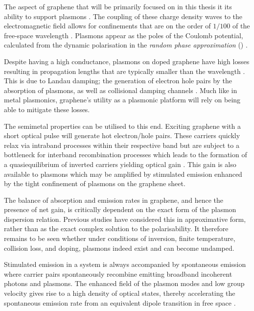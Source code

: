 The aspect of graphene that will be primarily focused on in this thesis it its
ability to support plasmons
\cite{Shin2011,Chen2012,Fei2012,Grigorenko2012,Bao2012,Low2014,Stauber2014,
GarciaDeAbajo2014,Agarwal2015}.
The coupling of these charge density waves to the electromagnetic field allows
for confinements that are on the order of $1/100$ of the free-space wavelength
\cite{Koppens2011,Chen2012}.
Plasmons appear as the poles of the Coulomb potential, calculated from the
dynamic polarisation in the \emph{random phase approximation} (\rpa)
\cite{Wunsch2006,Hwang2007}.

Despite having a high conductance, plasmons on doped graphene have high losses
resulting in propagation lengths that are typically smaller than the wavelength
\cite{Tassin2012}.
This is due to Landau damping; the generation of electron hole pairs by the
absorption of plasmons, as well as collisional damping channels
\cite{Yan2013,Low2014}.
Much like in metal plasmonics, graphene's utility as a plasmonic platform will
rely on being able to mitigate these losses.

The semimetal properties can be utilised to this end.
Exciting graphene with a short optical pulse will generate hot electron/hole
pairs.
These carriers quickly relax via intraband processes within their respective
band but are subject to a bottleneck for interband recombination processes
which leads to the formation of a quasiequilibrium of inverted carriers
yielding optical gain \cite{Ryzhii2007,Li2012,Winzer2013}.
This gain is also available to plasmons which may be amplified by stimulated
emission \cite{Rana2008,Rana2011,Dubinov2011,Popov2012} enhanced by the tight
confinement of plasmons on the graphene sheet.

The balance of absorption and emission rates in graphene, and hence the presence
of net gain, is critically dependent on the exact form of the plasmon dispersion
relation.
Previous studies have considered this in approximative form, rather than as the
exact complex solution to the \rpa polarisability.
It therefore remains to be seen whether under conditions of inversion, finite
temperature, collision loss, and doping, plasmons indeed exist and can become
undamped.

Stimulated emission in a system is always accompanied by spontaneous emission
where carrier pairs spontaneously recombine emitting broadband incoherent
photons \cite{Mecklenburg2010} and plasmons.
The enhanced field of the plasmon modes and low group velocity gives rise to a
high density of optical states, thereby accelerating the spontaneous emission
rate from an equivalent dipole transition in free space \cite{Nikitin2013}.

